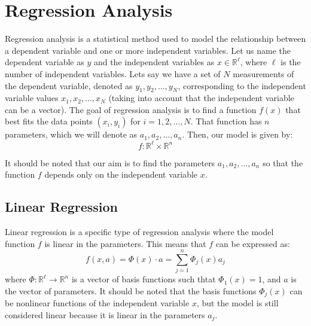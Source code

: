 \section{Regression Analysis}

Regression analysis is a statistical method used to model the relationship between a dependent variable and one or more independent variables. Let us name the dependent variable as $y$ and the independent variables as $x\in \mathbb{R}^{\ell}$, where $\ell$ is the number of independent variables. Lets say we have a set of $N$ measurements of the dependent variable, denoted as $y_1, y_2, \ldots, y_N$, corresponding to the independent variable values $x_1, x_2, \ldots, x_N$ (taking into account that the independent variable can be a vector). The goal of regression analysis is to find a function $f(x)$ that best fits the data points $(x_i, y_i)$ for $i = 1, 2, \ldots, N$. That function has $n$ parameters, which we will denote as $a_1, a_2, \ldots, a_n$. Then, our model is given by:
\begin{equation*}
    f: \mathbb{R}^{\ell} \times \mathbb{R}^n
\end{equation*}

It should be noted that our aim is to find the parameters $a_1, a_2, \ldots, a_n$ so that the function $f$ depends only on the independent variable $x$.

\subsection{Linear Regression}

Linear regression is a specific type of regression analysis where the model function $f$ is linear in the parameters. This means that $f$ can be expressed as:
\begin{equation*}
    f(x, a) = \Phi(x) \cdot a = \sum_{j=1}^n \Phi_j(x) a_j
\end{equation*}
where $\Phi: \mathbb{R}^{\ell} \to \mathbb{R}^n$ is a vector of basis functions such thtat $\Phi_1(x)=1$, and $a$ is the vector of parameters. It should be noted that the basis functions $\Phi_j(x)$ can be nonlinear functions of the independent variable $x$, but the model is still considered linear because it is linear in the parameters $a_j$.\\

